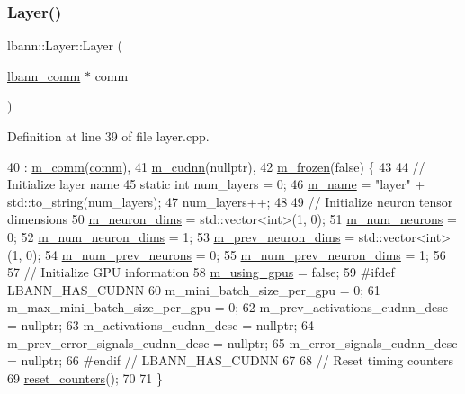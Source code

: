 \subsubsection{\texorpdfstring{Layer()}{Layer()}\hspace{0.1cm}{\footnotesize\ttfamily [1/2]}}
{\footnotesize\ttfamily lbann\+::\+Layer\+::\+Layer (\begin{DoxyParamCaption}\item[{\hyperlink{classlbann_1_1lbann__comm}{lbann\+\_\+comm} $\ast$}]{comm }\end{DoxyParamCaption})}



Definition at line 39 of file layer.\+cpp.


\begin{DoxyCode}
40   : \hyperlink{classlbann_1_1Layer_a5de05c52f22e0bbd7c703bec3ad4dbf2}{m\_comm}(\hyperlink{file__io_8cpp_ab048c6f9fcbcfaa57ce68b00263dbebe}{comm}),
41     \hyperlink{classlbann_1_1Layer_a08dbb94239e3b8c96329786c57c72e21}{m\_cudnn}(\textcolor{keyword}{nullptr}),
42     \hyperlink{classlbann_1_1Layer_afdc60df9731a3ecdeeeb8175fa483676}{m\_frozen}(\textcolor{keyword}{false}) \{
43 
44   \textcolor{comment}{// Initialize layer name}
45   \textcolor{keyword}{static} \textcolor{keywordtype}{int} num\_layers = 0;
46   \hyperlink{classlbann_1_1Layer_aa47109ad09b399142fa92f9d3702189f}{m\_name} = \textcolor{stringliteral}{"layer"} + std::to\_string(num\_layers);
47   num\_layers++;
48 
49   \textcolor{comment}{// Initialize neuron tensor dimensions}
50   \hyperlink{classlbann_1_1Layer_abb34bb8031f57a483e2e327a5f229f48}{m\_neuron\_dims} = std::vector<int>(1, 0);
51   \hyperlink{classlbann_1_1Layer_a6b5ebc8a7d9329d8a773ed787e7b41d8}{m\_num\_neurons} = 0;
52   \hyperlink{classlbann_1_1Layer_adfd6178d21498c9095cd947ae1eb2d6a}{m\_num\_neuron\_dims} = 1;
53   \hyperlink{classlbann_1_1Layer_ae204d1a2a79606eaa117273857ff62a3}{m\_prev\_neuron\_dims} = std::vector<int>(1, 0);
54   \hyperlink{classlbann_1_1Layer_ac7b30f4e28d58204bfcbb76886f9136d}{m\_num\_prev\_neurons} = 0;
55   \hyperlink{classlbann_1_1Layer_adc052afb38f170e839db00d3c8151d1e}{m\_num\_prev\_neuron\_dims} = 1;
56 
57   \textcolor{comment}{// Initialize GPU information}
58   \hyperlink{classlbann_1_1Layer_af7881cb5eff5207c15fa835d65462e8f}{m\_using\_gpus} = \textcolor{keyword}{false};
59 \textcolor{preprocessor}{#ifdef LBANN\_HAS\_CUDNN}
60   m\_mini\_batch\_size\_per\_gpu = 0;
61   m\_max\_mini\_batch\_size\_per\_gpu = 0;
62   m\_prev\_activations\_cudnn\_desc = \textcolor{keyword}{nullptr};
63   m\_activations\_cudnn\_desc = \textcolor{keyword}{nullptr};
64   m\_prev\_error\_signals\_cudnn\_desc = \textcolor{keyword}{nullptr};
65   m\_error\_signals\_cudnn\_desc = \textcolor{keyword}{nullptr};
66 \textcolor{preprocessor}{#endif // LBANN\_HAS\_CUDNN}
67 
68   \textcolor{comment}{// Reset timing counters}
69   \hyperlink{classlbann_1_1Layer_a979bb6891e6bf5edba2184cd0b59cf54}{reset\_counters}();
70 
71 \}
\end{DoxyCode}
